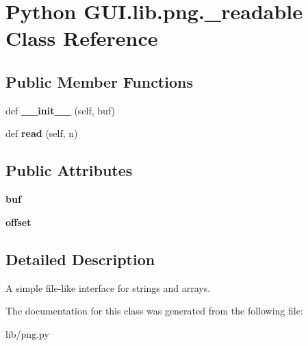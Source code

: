 \hypertarget{class_python_01_g_u_i_1_1lib_1_1png_1_1__readable}{}\section{Python G\+U\+I.\+lib.\+png.\+\_\+readable Class Reference}
\label{class_python_01_g_u_i_1_1lib_1_1png_1_1__readable}
\subsection*{Public Member Functions}
\begin{DoxyCompactItemize}
\item 
\mbox{\label{class_python_01_g_u_i_1_1lib_1_1png_1_1__readable_ab8e02a0e1d329a1c1ea848a94befaec1}} 
def {\bfseries \+\_\+\+\_\+init\+\_\+\+\_\+} (self, buf)
\item 
\mbox{\label{class_python_01_g_u_i_1_1lib_1_1png_1_1__readable_acb81ccfd56470e661b850d0297716056}} 
def {\bfseries read} (self, n)
\end{DoxyCompactItemize}
\subsection*{Public Attributes}
\begin{DoxyCompactItemize}
\item 
\mbox{\label{class_python_01_g_u_i_1_1lib_1_1png_1_1__readable_a75d0d0d7492bdf2fb88422295c14812f}} 
{\bfseries buf}
\item 
\mbox{\label{class_python_01_g_u_i_1_1lib_1_1png_1_1__readable_a900b91b6f3f0ec7a41d6d151b9c663ab}} 
{\bfseries offset}
\end{DoxyCompactItemize}


\subsection{Detailed Description}
\begin{DoxyVerb}A simple file-like interface for strings and arrays.
\end{DoxyVerb}
 

The documentation for this class was generated from the following file\+:\begin{DoxyCompactItemize}
\item 
lib/png.\+py\end{DoxyCompactItemize}
